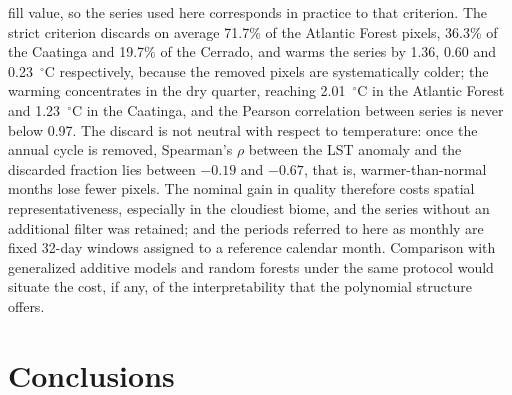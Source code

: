\documentclass[a4paper,fleqn]{cas-dc}
\begin{document}
fill value, so the series used here corresponds in practice to that criterion. The strict criterion discards on average 71.7\% of the Atlantic Forest pixels, 36.3\% of the Caatinga and 19.7\% of the Cerrado, and warms the series by 1.36, 0.60 and 0.23~$^{\circ}$C respectively, because the removed pixels are systematically colder; the warming concentrates in the dry quarter, reaching 2.01~$^{\circ}$C in the Atlantic Forest and 1.23~$^{\circ}$C in the Caatinga, and the Pearson correlation between series is never below 0.97. The discard is not neutral with respect to temperature: once the annual cycle is removed, Spearman's $\rho$ between the LST anomaly and the discarded fraction lies between $-0.19$ and $-0.67$, that is, warmer-than-normal months lose fewer pixels. The nominal gain in quality therefore costs spatial representativeness, especially in the cloudiest biome, and the series without an additional filter was retained; and the periods referred to here as monthly are fixed 32-day windows assigned to a reference calendar month. Comparison with generalized additive models and random forests under the same protocol would situate the cost, if any, of the interpretability that the polynomial structure offers.

\section{Conclusions}\label{sec:conclusions}
\end{document}

